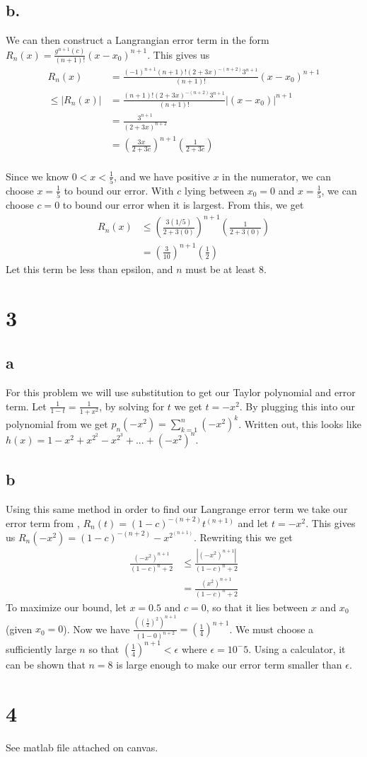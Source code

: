 \documentclass{article}
\begin{document}
\subsection*{b.}
We can then construct a Langrangian error term in the form $R_n(x) = \frac{g^{n+1}(c)}{(n+1)!}(x-x_0)^{n+1}$. This gives us 
\begin{align*}
R_n(x) & = \frac{(-1)^{n+1}(n+1)!(2+3x)^{-(n+2)}3^{n+1}}{(n+1)!}(x-x_0)^{n+1}\\
\leqslant |R_n(x)| & = \frac{(n+1)!(2+3x)^{-(n+2)}3^{n+1}}{(n+1)!}|(x-x_0)|^{n+1} \\
& = \frac{3^{n+1}}{(2+3x)^{n+2}} \\
& = (\frac{3x}{2+3c})^{n+1}(\frac{1}{2+3c}) \\
\end{align*}

Since we know $0 < x < \frac{1}{5}$, and we have positive $x$ in the numerator, we can choose $x = \frac{1}{5}$ to bound our error. With $c$ lying between $x_0 = 0$ and $x = \frac{1}{5}$, we can choose $c=0$ to bound our error when it is largest. From this, we get
\begin{align*}
R_n(x) & \leqslant (\frac{3(1/5)}{2+3(0)})^{n+1}(\frac{1}{2+3(0)}) \\
& = (\frac{3}{10})^{n+1}(\frac{1}{2})
\end{align*}
Let this term be less than epsilon, and $n$ must be at least 8.

\section*{3}
\subsection*{a}
For this problem we will use substitution to get our Taylor polynomial and error term. Let $\frac{1}{1-t} = \frac{1}{1+x^2}$, by solving for $t$ we get $t = -x^2$. By plugging this into our polynomial from  we get $p_n(-x^2) = \sum_{k=1}^{n} (-x^2)^{k}$. Written out, this looks like $h(x) = 1 - x^2 + x^{2^2} - x^{2^3} + ... + (-x^2)^n$.
\subsection*{b}
Using this same method in order to find our Langrange error term we take our error term from , $R_n(t)=(1-c)^{-(n+2)}t^{(n+1)}$ and let $t = -x^2$. This gives us $R_n(-x^2)=(1-c)^{-(n+2)}-x^{2^{(n+1)}}$. Rewriting this we get
\begin{align*}
\frac{(-x^2)^{n+1}}{(1-c)^n+2} & \leqslant \frac{|(-x^2)^{n+1}|}{(1-c)^n+2}  \\
& = \frac{(x^2)^{n+1}}{(1-c)^n+2}
\end{align*}
To maximize our bound, let $x = 0.5$ and $c = 0$, so that it lies between $x$ and $x_0$ (given $x_0 = 0$). Now we have $\frac{((\frac{1}{2})^2)^{n+1}}{(1-0)^{n+2}} = (\frac{1}{4})^{n+1}$. We must choose a sufficiently large $n$ so that $(\frac{1}{4})^{n+1} < \epsilon$ where $\epsilon = 10^-5$. Using a calculator, it can be shown that $n = 8$ is large enough to make our error term smaller than $\epsilon$.

\section*{4}
See matlab file attached on canvas.
\end{document}
